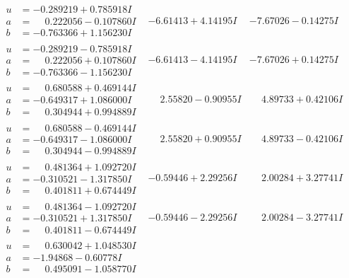 \documentclass[1p]{elsarticle_modified}
\theoremstyle{definition}
\begin{document}
$$\begin{array}{c|c|c}
\begin{aligned}
u &= -0.289219 + 0.785918 I \\
a &= \phantom{-}0.222056 - 0.107860 I \\
b &= -0.763366 + 1.156230 I\end{aligned}
 & -6.61413 + 4.14195 I & -7.67026 - 0.14275 I \\ \hline\begin{aligned}
u &= -0.289219 - 0.785918 I \\
a &= \phantom{-}0.222056 + 0.107860 I \\
b &= -0.763366 - 1.156230 I\end{aligned}
 & -6.61413 - 4.14195 I & -7.67026 + 0.14275 I \\ \hline\begin{aligned}
u &= \phantom{-}0.680588 + 0.469144 I \\
a &= -0.649317 + 1.086000 I \\
b &= \phantom{-}0.304944 + 0.994889 I\end{aligned}
 & \phantom{-}2.55820 - 0.90955 I & \phantom{-}4.89733 + 0.42106 I \\ \hline\begin{aligned}
u &= \phantom{-}0.680588 - 0.469144 I \\
a &= -0.649317 - 1.086000 I \\
b &= \phantom{-}0.304944 - 0.994889 I\end{aligned}
 & \phantom{-}2.55820 + 0.90955 I & \phantom{-}4.89733 - 0.42106 I \\ \hline\begin{aligned}
u &= \phantom{-}0.481364 + 1.092720 I \\
a &= -0.310521 - 1.317850 I \\
b &= \phantom{-}0.401811 + 0.674449 I\end{aligned}
 & -0.59446 + 2.29256 I & \phantom{-}2.00284 + 3.27741 I \\ \hline\begin{aligned}
u &= \phantom{-}0.481364 - 1.092720 I \\
a &= -0.310521 + 1.317850 I \\
b &= \phantom{-}0.401811 - 0.674449 I\end{aligned}
 & -0.59446 - 2.29256 I & \phantom{-}2.00284 - 3.27741 I \\ \hline\begin{aligned}
u &= \phantom{-}0.630042 + 1.048530 I \\
a &= -1.94868 - 0.60778 I \\
b &= \phantom{-}0.495091 - 1.058770 I\end{aligned}

\end{array}$$
\end{document}
